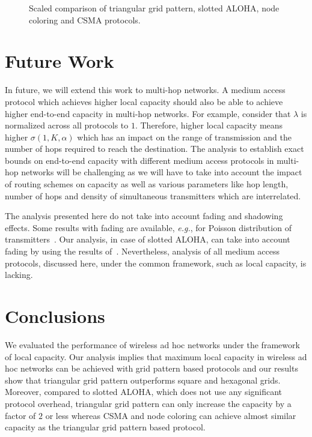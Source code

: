 \documentclass[12pt,english]{article}
\begin{document}
\begin{figure*}[!t]
\centering
{}
\caption{Scaled comparison of triangular grid pattern, slotted ALOHA, node coloring and CSMA protocols. 
\label{fig:improvement}}
\end{figure*}

\section{Future Work}
\label{sec:future}

In future, we will extend this work to multi-hop networks. A medium access protocol which achieves higher local capacity should also be able to achieve higher end-to-end capacity in multi-hop networks. For example, consider that $\lambda$ is normalized across all protocols to $1$. Therefore, higher local capacity means higher $\sigma(1,K,\alpha)$ which has an impact on the range of transmission and the number of hops required to reach the destination. The analysis to establish exact bounds on end-to-end capacity with different medium access protocols in multi-hop networks will be challenging as we will have to take into account the impact of routing schemes on capacity as well as various parameters like hop length, number of hops and density of simultaneous transmitters which are interrelated. 

The analysis presented here do not take into account fading and shadowing effects. Some results with fading are available, {\it e.g.}, for Poisson distribution of transmitters~\cite{Weber2,Bartek,Haenggi}. Our analysis, in case of slotted ALOHA, can take into account fading by using the results of~\cite{Jacquet:2009}. Nevertheless, analysis of all medium access protocols, discussed here, under the common framework, such as local capacity, is lacking. 

\section{Conclusions}
\label{sec:conclude}

We evaluated the performance of wireless ad hoc networks under the framework of local capacity. Our analysis implies that maximum local capacity in wireless ad hoc networks can be achieved with grid pattern based protocols and our results show that triangular grid pattern outperforms square and hexagonal grids. Moreover, compared to slotted ALOHA, which does not use any significant protocol overhead, triangular grid pattern can only increase the capacity by a factor of $2$ or less whereas CSMA and node coloring can achieve almost similar capacity as the triangular grid pattern based protocol.  
\end{document}
